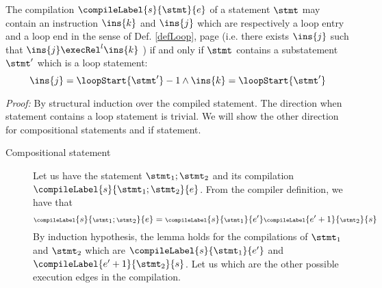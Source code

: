 \begin{compProp9A}  The compilation $\compileLabel{s}{\stmt}{e}$ of a statement $\stmt$ may contain an instruction $\ins{k}$ and $\ins{j}$  which are respectively 
a loop entry and a loop end  in the sense of Def.
\ref{defLoop}, page \pageref{defLoop}  (i.e. there exists $\ins{j}$ such that $\ins{j} \execRel^{l} \ins{k}$ ) if and only if  $\stmt$  contains 
 a substatement $\stmt'$ which is a loop statement:
 $$ \ins{j} = \loopStart{\stmt'}  - 1 \wedge  \ins{k} = \loopStart{\stmt'}  $$
\end{compProp9A}
\textit{Proof:}
By structural induction over the compiled statement. The direction when statement contains a loop statement is trivial.
We will show the other direction for compositional statements and if statement.
\begin{description}
\item[Compositional statement]
Let us have the statement $\stmt_1;\stmt_2$ and its compilation 
 $\compileLabel{s}{\stmt_1;\stmt_2}{e}$. From the compiler definition,
we have that  
$$ \scriptsize{\compileLabel{s}{\stmt_1;\stmt_2}{e} = \compileLabel{s}{\stmt_1}{e'}\compileLabel{e'+1}{\stmt_2}{s}}$$
 By induction hypothesis, the lemma holds for  the compilations of $\stmt_1$ and   $\stmt_2$ which are 
$\compileLabel{s}{\stmt_1}{e'}$ and  $\compileLabel{e'+1}{\stmt_2}{s}$.
Let us which are the other possible execution edges in the compilation.



\end{description}
